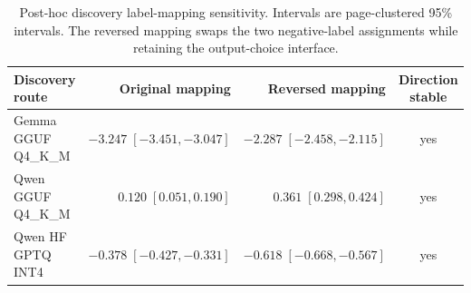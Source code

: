 \begin{table}[H]
\centering
\caption{Post-hoc discovery label-mapping sensitivity. Intervals are page-clustered 95\% intervals. The reversed mapping swaps the two negative-label assignments while retaining the output-choice interface.}
\label{tab:label-mapping-sensitivity}
\small
\begin{tabular}{lrrc}
\toprule
Discovery route & Original mapping & Reversed mapping & Direction stable \\
\midrule
Gemma GGUF Q4\_K\_M & $-3.247\;[-3.451,-3.047]$ & $-2.287\;[-2.458,-2.115]$ & yes \\
Qwen GGUF Q4\_K\_M & $0.120\;[0.051,0.190]$ & $0.361\;[0.298,0.424]$ & yes \\
Qwen HF GPTQ INT4 & $-0.378\;[-0.427,-0.331]$ & $-0.618\;[-0.668,-0.567]$ & yes \\
\bottomrule
\end{tabular}
\end{table}
